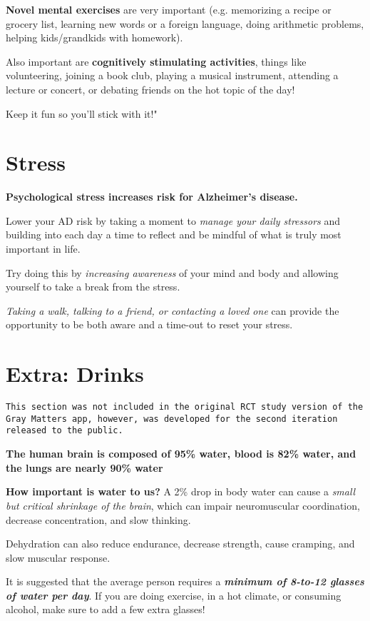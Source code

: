 \textbf{Novel mental exercises} are very important (e.g. memorizing a recipe or grocery list, learning new words or a foreign language, doing arithmetic problems, helping kids/grandkids with homework). 

Also important are \textbf{cognitively stimulating activities}, things like volunteering, joining a book club, playing a musical instrument, attending a lecture or concert, or debating friends on the hot topic of the day! 

Keep it fun so you'll stick with it!"

\section{Stress}
\textbf{Psychological stress increases risk for Alzheimer's disease.}

Lower your AD risk by taking a moment to \textit{manage your daily stressors} and building into each day a time to reflect and be mindful of what is truly most important in life. 

Try doing this by \textit{increasing awareness }of your mind and body and allowing yourself to take a break from the stress. 

\textit{Taking a walk, talking to a friend, or contacting a loved one} can provide the opportunity to be both aware and a time-out to reset your stress.

\section{Extra: Drinks}
\texttt{This section was not included in the original RCT study version of the Gray Matters app, however, was developed for the second iteration released to the public.}

\textbf{The human brain is composed of 95\% water, blood is 82\% water, and the lungs are nearly 90\% water}

\textbf{How important is water to us?}
\newline A 2\% drop in body water can cause a \textit{small but critical shrinkage of the brain}, which can impair neuromuscular coordination, decrease concentration, and slow thinking. 

Dehydration can also reduce endurance, decrease strength, cause cramping, and slow muscular response.

It is suggested that the average person requires a \textbf{\textit{minimum of 8-to-12 glasses of water per day}}. If you are doing exercise, in a hot climate, or consuming alcohol, make sure to add a few extra glasses!
